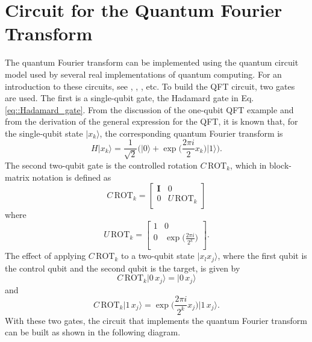 \documentclass[a4paper]{article}
\begin{document}
\section{Circuit for the Quantum Fourier Transform}
The quantum Fourier transform can be implemented using the quantum circuit model used by several real implementations of quantum computing. For an introduction to these circuits, see \cite{Qiskit}, \cite{Medina}, \cite{Nielsen}, etc. To build the QFT circuit, two gates are used. The first is a single-qubit gate, the Hadamard gate in Eq. \ref{eq::Hadamard_gate}. From the discussion of the one-qubit QFT example and from the derivation of the general expression for the QFT, it is known that, for the single-qubit state $\vert x_k\rangle$, the corresponding quantum Fourier transform is
\begin{equation}
H\vert x_k\rangle=\frac{1}{\sqrt{2}}\bigg(\vert 0\rangle + \exp{\bigg(\frac{2\pi i}{2} x_k\bigg)}\vert 1\rangle\bigg).
\end{equation}
The second two-qubit gate is the controlled rotation $C\,\text{ROT}_k$, which in block-matrix notation is defined as
\begin{equation}
C\,\text{ROT}_k=
\begin{bmatrix}
\mathbf{I}& 0\\
0& U\,\text{ROT}_k\\
\end{bmatrix}
\end{equation}
where
\begin{equation}
U\,\text{ROT}_k=
\begin{bmatrix}
1& 0\\
0& \exp{\big(\frac{2\pi i}{2^k}\big)}\\
\end{bmatrix}.
\end{equation}
The effect of applying $C\,\text{ROT}_k$ to a two-qubit state $\vert x_l x_j\rangle$, where the first qubit is the control qubit and the second qubit is the target, is given by
\begin{equation}
C\,\text{ROT}_k \vert 0\,x_j\rangle=\vert 0 \, x_j\rangle
\end{equation}
and
\begin{equation}
C\,\text{ROT}_k \vert 1\,x_j\rangle=\exp{\bigg(\frac{2\pi i }{2^k} x_j\bigg)}\vert 1 \, x_j\rangle.
\end{equation}
With these two gates, the circuit that implements the quantum Fourier transform can be built as shown in the following diagram.
\end{document}
